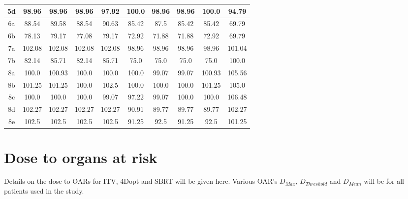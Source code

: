 \begin{table}[H]
\begin{tabular}{c|c|c|c|c|c|c|c|c|c}
 5d & 98.96 & 98.96 & 98.96 & 97.92 & 100.0 & 98.96 & 98.96 & 100.0 & 94.79 \\ 
  \hline 
6a & 88.54 & 89.58 & 88.54 & 90.63 & 85.42 & 87.5 & 85.42 & 85.42 & 69.79 \\ 
 6b & 78.13 & 79.17 & 77.08 & 79.17 & 72.92 & 71.88 & 71.88 & 72.92 & 69.79 \\ 
  \hline 
7a & 102.08 & 102.08 & 102.08 & 102.08 & 98.96 & 98.96 & 98.96 & 98.96 & 101.04 \\ 
 7b & 82.14 & 85.71 & 82.14 & 85.71 & 75.0 & 75.0 & 75.0 & 75.0 & 100.0 \\ 
  \hline 
8a & 100.0 & 100.93 & 100.0 & 100.0 & 100.0 & 99.07 & 99.07 & 100.93 & 105.56 \\ 
 8b & 101.25 & 101.25 & 100.0 & 102.5 & 100.0 & 100.0 & 100.0 & 101.25 & 105.0 \\ 
 8c & 100.0 & 100.0 & 100.0 & 99.07 & 97.22 & 99.07 & 100.0 & 100.0 & 106.48 \\ 
 8d & 102.27 & 102.27 & 102.27 & 102.27 & 90.91 & 89.77 & 89.77 & 89.77 & 102.27 \\ 
 8e & 102.5 & 102.5 & 102.5 & 102.5 & 91.25 & 92.5 & 91.25 & 92.5 & 101.25 \\ 
  \hline 
  \hline 

  
  \end{tabular}
  \label{tab:ctvcomplex}
\end{table}


 \newpage
\section{Dose to organs at risk}

Details on the dose to OARs for ITV, 4Dopt and SBRT will be given here. Various OAR's $D_{Max}$, $D_{Threshold}$ and $D_{Mean}$ will be for all patients used in the study.

